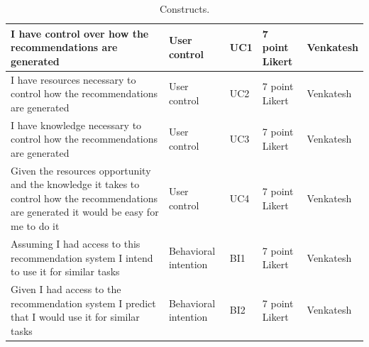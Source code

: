 \documentclass[a4paper,12pt]{article}
\newcommand{\citeyearonly}[1]{\citeyearpar{#1}}
\begin{document}
\begin{table}
{\begin{tabular}{|p{7cm}|l|p{2cm}|p{3cm}|p{3cm}|}
        I have control over how the recommendations are generated & User control & UC1 & 7 point Likert & Venkatesh \citeyearonly{venkateshDeterminantsPerceivedEase2000} \\ \hline
        I have resources necessary to control how the recommendations are generated & User control & UC2 & 7 point Likert & Venkatesh \citeyearonly{venkateshDeterminantsPerceivedEase2000} \\ \hline
        I have knowledge necessary to control how the recommendations are generated & User control & UC3 & 7 point Likert & Venkatesh \citeyearonly{venkateshDeterminantsPerceivedEase2000} \\ \hline
        Given the resources opportunity and the knowledge it takes to control how the recommendations are generated  it would be easy for me to do it & User control & UC4 & 7 point Likert & Venkatesh \citeyearonly{venkateshDeterminantsPerceivedEase2000} \\ \hline
        Assuming I had access to this recommendation system I intend to use it for similar tasks & Behavioral intention & BI1 & 7 point Likert & Venkatesh \citeyearonly{venkateshDeterminantsPerceivedEase2000} \\ \hline
        Given I had access to the recommendation system  I predict that I would use it for similar tasks & Behavioral intention & BI2 & 7 point Likert & Venkatesh \citeyearonly{venkateshDeterminantsPerceivedEase2000} \\ \hline
    \end{tabular}
    }
    \caption{Constructs.}
    \label{tab:questionnaire_items}
\end{table}
\end{document}
